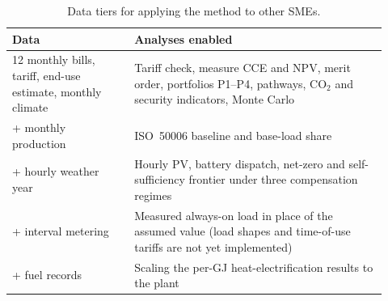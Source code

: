 \documentclass[preprint,12pt,authoryear]{elsarticle}
\begin{document}
\begin{table}[!htbp]
\centering
\caption{Data tiers for applying the method to other SMEs.}
\label{tab:datatiers}
\footnotesize
\begin{tabular}{p{0.30\linewidth}p{0.62\linewidth}}
\toprule
Data & Analyses enabled \\
\midrule
12 monthly bills, tariff, end-use estimate, monthly climate & Tariff check, measure CCE and NPV, merit order, portfolios P1--P4, pathways, CO$_2$ and security indicators, Monte Carlo \\
+ monthly production & ISO~50006 baseline and base-load share \\
+ hourly weather year & Hourly PV, battery dispatch, net-zero and self-sufficiency frontier under three compensation regimes \\
+ interval metering & Measured always-on load in place of the assumed value (load shapes and time-of-use tariffs are not yet implemented) \\
+ fuel records & Scaling the per-GJ heat-electrification results to the plant \\
\bottomrule
\end{tabular}
\end{table}
\end{document}
